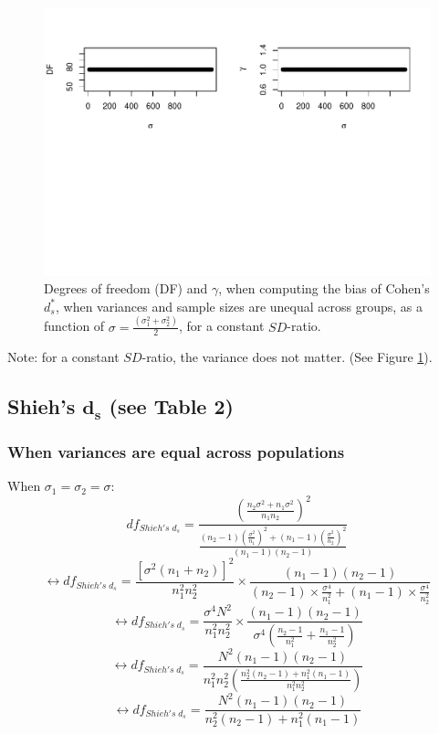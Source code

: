 \documentclass[
  english,
  man,mask]{apa6}
\begin{document}
\begin{figure}
\centering
\includegraphics{Theoretical-Bias-of-all-estimators-as-a-function-of-population-parameters_files/figure-latex/biascohendprimehetunbalvariance2-1.pdf}
\caption{\label{fig:biascohendprimehetunbalvariance2}Degrees of freedom (DF) and \(\gamma\), when computing the bias of Cohen's \(d^*_s\), when variances and sample sizes are unequal across groups, as a function of \(\sigma= \frac{(\sigma_1^2+\sigma_2^2)}{2}\), for a constant \(SD\)-ratio.}
\end{figure}

Note: for a constant \(SD\)-ratio, the variance does not matter. (See Figure \ref{fig:biascohendprimehetunbalvariance2}).

\hypertarget{shiehs-bmd_s-see-table-2}{%
\subsection{\texorpdfstring{Shieh's \(\bm{d_s}\) (see Table 2)}{Shieh's \textbackslash bm\{d\_s\} (see Table 2)}}\label{shiehs-bmd_s-see-table-2}}

\hypertarget{when-variances-are-equal-across-populations-1}{%
\subsubsection{When variances are equal across populations}\label{when-variances-are-equal-across-populations-1}}

When \(\sigma_1=\sigma_2=\sigma\):
\[df_{Shieh's \; d_s} = \frac{\left( \frac{n_2\sigma^2+n_1\sigma^2}{n_1n_2}\right)^2}{\frac{(n_2-1)\left( \frac{\sigma^2}{n_1}\right)^2+(n_1-1)\left( \frac{\sigma^2}{n_2}\right)^2}{(n_1-1)(n_2-1)}}\]
\[\leftrightarrow df_{Shieh's \; d_s} = \frac{[\sigma^2(n_1+n_2)]^2}{n_1^2n_2^2} \times \frac{(n_1-1)(n_2-1)}{(n_2-1) \times  \frac{\sigma^4}{n_1^2}+(n_1-1) \times \frac{\sigma^4}{n_2^2}}\]
\[\leftrightarrow df_{Shieh's \; d_s} = \frac{\sigma^4N^2}{n_1^2n_2^2} \times \frac{(n_1-1)(n_2-1)}{\sigma^4 \left( \frac{n_2-1}{n^2_1}+\frac{n_1-1}{n^2_2}\right) }\]
\[\leftrightarrow df_{Shieh's \; d_s} = \frac{N^2(n_1-1)(n_2-1)}{n_1^2n_2^2 \left( \frac{n_2^2(n_2-1)+n_1^2(n_1-1)}{n_1^2n_2^2}\right)}\]
\[\leftrightarrow df_{Shieh's \; d_s} = \frac{N^2(n_1-1)(n_2-1)}{n_2^2(n_2-1)+n_1^2(n_1-1)}\]
\end{document}
